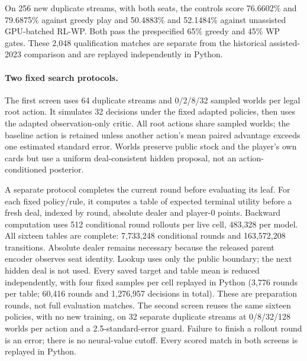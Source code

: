 On 256 new duplicate streams, with both seats, the controls score 76.6602\%
and 79.6875\% against greedy play and 50.4883\% and 52.1484\% against
unassisted GPU-batched RL-WP. Both pass the prespecified 65\% greedy and
45\% WP gates. These 2,048 qualification matches are separate from the
historical assisted-2023 comparison and are replayed independently in Python.

\paragraph{Two fixed search protocols.}
The first screen uses 64 duplicate streams and 0/2/8/32 sampled worlds per
legal root action. It simulates 32 decisions under the fixed adapted policies,
then uses the adapted observation-only critic. All root actions share sampled
worlds; the baseline action is retained unless another action's mean paired
advantage exceeds one estimated standard error. Worlds preserve public stock
and the player's own cards but use a uniform deal-consistent hidden proposal,
not an action-conditioned posterior.

A separate protocol completes the current round before evaluating its leaf.
For each fixed policy/rule, it computes a table of expected terminal utility
before a fresh deal, indexed by round, absolute dealer and player-0 points.
Backward computation uses 512 conditional round rollouts per live cell,
483,328 per model. All sixteen tables are complete: 7,733,248 conditional
rounds and 163,572,208 transitions. Absolute dealer remains necessary because the released
parent encoder observes seat identity. Lookup uses only the public boundary;
the next hidden deal is not used. Every saved target and table mean is reduced
independently, with four fixed samples per cell replayed in Python (3,776
rounds per table; 60,416 rounds and 1,276,957 decisions in total). These are
preparation rounds, not full evaluation matches.
The second screen reuses the same sixteen policies, with no new training,
on 32 separate duplicate streams at 0/8/32/128 worlds per action and a
2.5-standard-error guard. Failure to finish a rollout round is an error;
there is no neural-value cutoff. Every scored match in both screens is
replayed in Python.

